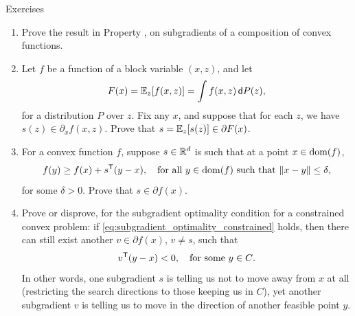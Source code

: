 \begin{xcb}{Exercises}
\begin{enumerate}[label=\thechapter.\arabic*]
\begin{enumerate}[label=\alph*.]
\item Prove that if $Z = U V^\T + W$, for $\|W\|_{\op} \leq 1$, $U^\T W = 0$,
  and $W V = 0$, then $\|Z\|_{\op} \leq 1$ and $\langle Z, X \rangle =
  \|X\|_{\tr}$. Hint: use an SVD of $Z$, and consider what the conditions on $W$
  say about the factors.   

\item Prove the opposite direction: if $\|Z\|_{\op} \leq 1$ and $\langle Z, X
  \rangle = \|X\|_{\tr}$, then $Z$ must be of the above form ($Z = U V^\T + W$,   
  where $\|W\|_{\op} \leq 1$, $U^\T W = 0$, and $W V = 0$). Hint: define $W = Z
  - U V^\T$, and consider what the conditions on $Z$ say about $W$. 

\item Use the above parts and \eqref{eq:norm_subgradients} to prove the
  statement in Example .
\end{enumerate}

\item Prove the result in Property , on
  subgradients of a composition of convex functions.   

\item Let $f$ be a function of a block variable $(x,z)$, and let 
  \[
  F(x) = \mathbb{E}_z[ f(x,z) ] = \int f(x,z) \, \mathsf{d}{P}(z),
  \]
  for a distribution $P$ over $z$. Fix any $x$, and suppose that for each $z$,
  we have $s(z) \in \partial_x f(x,z)$. Prove that $s = \mathbb{E}_z[s(z)] \in \partial
  F(x)$.  

\item For a convex function $f$, suppose $s \in \mathbb{R}^d$ is such that at a point $x
  \in \operatorname{dom}(f)$,
  \[
  f(y) \geq f(x) + s^{\mathsf{T}} (y-x), \quad \text{for all $y \in \operatorname{dom}(f)$ such that
    $\|x - y\| \leq \delta$},
  \]
  for some $\delta>0$. Prove that $s \in \partial f(x)$. %

\item Prove or disprove, for the subgradient optimality condition for a
  constrained convex problem: if \eqref{eq:subgradient_optimality_constrained} 
  holds, then there can still exist another $v \in \partial f(x)$, $v \not= s$,
  such that 
  \[
  v^{\mathsf{T}} (y - x) < 0, \quad \text{for some $y \in C$}.
  \]
  In other words, one subgradient $s$ is telling us not to move away from $x$ at
  all (restricting the search directions to those keeping us in $C$), yet
  another subgradient $v$ is telling us to move in the direction of another   
  feasible point $y$.   


\end{enumerate}
\end{xcb}
